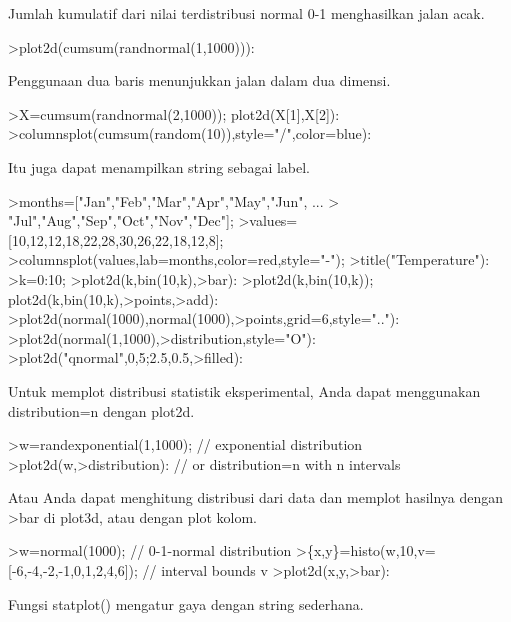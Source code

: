 \documentclass{article}
\begin{document}
\begin{eulernotebook}
\begin{eulercomment}
\begin{eulercomment}
\begin{eulercomment}
\begin{eulercomment}
\begin{eulercomment}
\begin{eulercomment}
\begin{eulercomment}
Jumlah kumulatif dari nilai terdistribusi normal 0-1 menghasilkan
jalan acak.
\end{eulercomment}
\begin{eulerprompt}
>plot2d(cumsum(randnormal(1,1000))):
\end{eulerprompt}
\begin{eulercomment}
Penggunaan dua baris menunjukkan jalan dalam dua dimensi.
\end{eulercomment}
\begin{eulerprompt}
>X=cumsum(randnormal(2,1000)); plot2d(X[1],X[2]):
>columnsplot(cumsum(random(10)),style="/",color=blue):
\end{eulerprompt}
\begin{eulercomment}
Itu juga dapat menampilkan string sebagai label.
\end{eulercomment}
\begin{eulerprompt}
>months=["Jan","Feb","Mar","Apr","May","Jun", ...
>  "Jul","Aug","Sep","Oct","Nov","Dec"];
>values=[10,12,12,18,22,28,30,26,22,18,12,8];
>columnsplot(values,lab=months,color=red,style="-");
>title("Temperature"):
>k=0:10;
>plot2d(k,bin(10,k),>bar):
>plot2d(k,bin(10,k)); plot2d(k,bin(10,k),>points,>add):
>plot2d(normal(1000),normal(1000),>points,grid=6,style=".."):
>plot2d(normal(1,1000),>distribution,style="O"):
>plot2d("qnormal",0,5;2.5,0.5,>filled):
\end{eulerprompt}
\begin{eulercomment}
Untuk memplot distribusi statistik eksperimental, Anda dapat
menggunakan distribution=n dengan plot2d.
\end{eulercomment}
\begin{eulerprompt}
>w=randexponential(1,1000); // exponential distribution
>plot2d(w,>distribution): // or distribution=n with n intervals
\end{eulerprompt}
\begin{eulercomment}
Atau Anda dapat menghitung distribusi dari data dan memplot hasilnya
dengan \textgreater{}bar di plot3d, atau dengan plot kolom.
\end{eulercomment}
\begin{eulerprompt}
>w=normal(1000); // 0-1-normal distribution
>\{x,y\}=histo(w,10,v=[-6,-4,-2,-1,0,1,2,4,6]); // interval bounds v
>plot2d(x,y,>bar):
\end{eulerprompt}
\begin{eulercomment}
Fungsi statplot() mengatur gaya dengan string sederhana.
\end{eulercomment}
\begin{eulerprompt}

\end{eulerprompt}
\end{eulercomment}
\end{eulercomment}
\end{eulercomment}
\end{eulercomment}
\end{eulercomment}
\end{eulercomment}
\end{eulernotebook}
\end{document}
